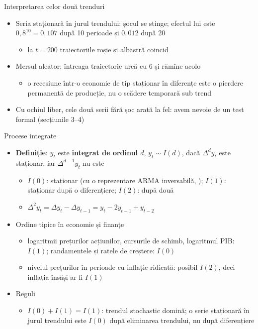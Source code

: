 \begin{frame}{Interpretarea celor două trenduri}
\itemsize{\small}
\begin{itemize}
    \item Seria staționară în jurul trendului: șocul se stinge; efectul lui este $0{,}8^{10} = 0{,}107$ după 10 perioade și $0{,}012$ după 20
    \begin{itemize}
        \item la $t = 200$ traiectoriile roșie și albastră coincid
    \end{itemize}
    \item Mersul aleator: întreaga traiectorie urcă cu 6 și rămîne acolo
    \begin{itemize}
        \item o recesiune într-o economie de tip staționar în diferențe este o pierdere permanentă de producție, nu o scădere temporară sub trend
    \end{itemize}
    \item Cu ochiul liber, cele două serii fără șoc arată la fel: avem nevoie de un test formal (secțiunile 3--4)
\end{itemize}
\end{frame}

\begin{frame}{Procese integrate}
\itemsize{\small}
\begin{itemize}
    \item \textbf{Definiție}: $y_t$ este \textbf{integrat de ordinul $d$}, $y_t \sim I(d)$, dacă $\Delta^d y_t$ este staționar, iar $\Delta^{d-1}y_t$ nu este
    \begin{itemize}
        \item $I(0)$: staționar (cu o reprezentare ARMA inversabilă, ); $I(1)$: staționar după o diferențiere; $I(2)$: după două
        \item $\Delta^2 y_t = \Delta y_t - \Delta y_{t-1} = y_t - 2y_{t-1} + y_{t-2}$
    \end{itemize}
    \item Ordine tipice în economie și finanțe
    \begin{itemize}
        \item logaritmii prețurilor acțiunilor, cursurile de schimb, logaritmul PIB: $I(1)$; randamentele și ratele de creștere: $I(0)$
        \item nivelul prețurilor în perioade cu inflație ridicată: posibil $I(2)$, deci inflația însăși ar fi $I(1)$
    \end{itemize}
    \item Reguli
    \begin{itemize}
        \item $I(0) + I(1) = I(1)$: trendul stochastic domină; o serie staționară în jurul trendului este $I(0)$ după eliminarea trendului, nu după diferențiere
    \end{itemize}
\end{itemize}
\end{frame}

